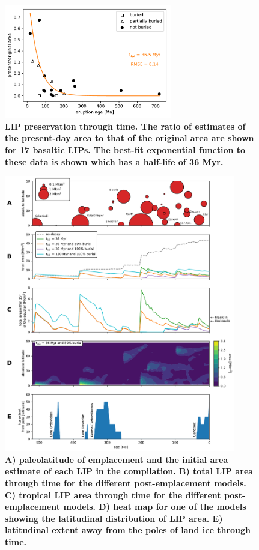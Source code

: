 \documentclass[11pt,letterpaper]{article}
\begin{document}
\begin{figure}[h!]
\begin{center}
	\includegraphics[width=0.65\textwidth]{Manuscript/Figures/LIP_Preservation.pdf}
	\caption{\textbf{LIP preservation through time. The ratio of estimates of the present-day area to that of the original area are shown for 17 basaltic LIPs. The best-fit exponential function to these data is shown which has a half-life of 36 Myr.}}
	\label{fig:LIP_preservation}
\end{center}
\end{figure}

\begin{figure}[h!]
\begin{center}
	\includegraphics[width=0.9\textwidth]{Manuscript/Figures/LIP_Areas.pdf}
	\caption{\textbf{A) paleolatitude of emplacement and the initial area estimate of each LIP in the compilation.
    B) total LIP area through time for the different post-emplacement models.
    C) tropical LIP area through time for the different post-emplacement models.
    D) heat map for one of the models showing the latitudinal distribution of LIP area.
    E) latitudinal extent away from the poles of land ice through time.}}
	\label{fig:LIP_area}
\end{center}
\end{figure}
\end{document}
